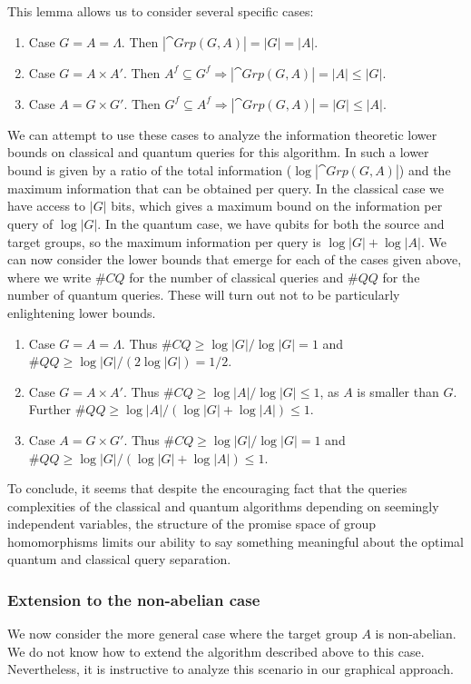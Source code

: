 This lemma allows us to consider several specific cases:
\begin{enumerate}
\item Case $G=A=\Lambda$.  Then $|\cat{Grp}(G,A)| = |G|=|A|$.
\item Case $G=A\times A'$. Then $A^f\subseteq G^f \Rightarrow |\cat{Grp}(G,A)| = |A| \le |G|$.
\item Case $A=G\times G'$. Then $G^f\subseteq A^f \Rightarrow |\cat{Grp}(G,A)| = |G| \le |A|$.
\end{enumerate}
\noindent We can attempt to use these cases to analyze the information theoretic lower bounds on classical and quantum queries for this algorithm.  In such a lower bound is given by a ratio of the total information ($\log|\cat{Grp}(G,A)|$) and the maximum information that can be obtained per query.  In the classical case we have access to $|G|$ bits, which gives a maximum bound on the information per query of $\log|G|$. In the quantum case, we have qubits for both the source and target groups, so the maximum information per query is $\log|G|+\log|A|$. We can now consider the lower bounds that emerge for each of the cases given above, where we write $\#CQ$ for the number of classical queries and $\#QQ$ for the number of quantum queries. These will turn out not to be particularly enlightening lower bounds.
\begin{enumerate}
\item Case $G=A=\Lambda$. Thus $\#CQ\ge\log|G|/\log|G|=1$ and $\#QQ\ge\log|G|/(2\log|G|)=1/2$.
\item Case $G=A\times A'$. Thus $\#CQ\ge\log|A|/\log|G|\le1$, as $A$ is smaller than $G$. Further $\#QQ\ge\log|A|/(\log|G|+\log|A|)\le1.$
\item Case $A=G\times G'$. Thus $\#CQ\ge\log|G|/\log|G|=1$ and $\#QQ\ge\log|G|/(\log|G|+\log|A|)\le1.$
\end{enumerate}

To conclude, it seems that despite the encouraging fact that the queries complexities of the classical and quantum algorithms depending on seemingly independent variables, the structure of the promise space of group homomorphisms limits our ability to say something meaningful about the optimal quantum and classical query separation.

\subsubsection*{Extension to the non-abelian case}
We now consider the more general case where the target group $A$ is non-abelian. We do not know how to extend the algorithm described above to this case.  Nevertheless, it is instructive to analyze this scenario in our graphical approach. 


